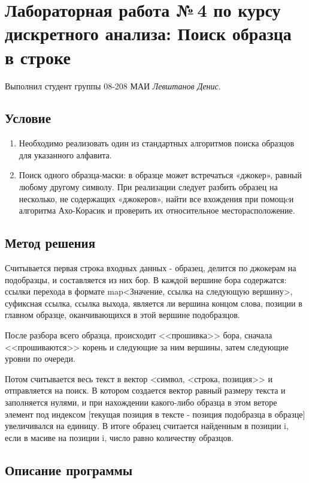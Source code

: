 \documentclass[12pt]{article}
\begin{document}
\section*{Лабораторная работа №\,4 по курсу дискретного анализа: Поиск образца в строке}

Выполнил студент группы 08-208 МАИ \textit{Левштанов Денис}.

\subsection*{Условие}

\begin{enumerate}
\item Необходимо реализовать один из стандартных алгоритмов поиска образцов для указанного алфавита.
\item Поиск одного образца-маски: в образце может встречаться «джокер», равный любому другому символу. При реализации следует разбить образец на несколько, не содержащих «джокеров», найти все вхождения при помощcи алгоритма Ахо-Корасик и проверить их относительное месторасположение.
\end{enumerate}

\subsection*{Метод решения}
\par Считывается первая строка входных данных - образец, делится по джокерам на подобразцы, и составляется из них бор. В каждой вершине бора содержатся: ссылки перехода в формате map<Значение, ссылка на следующую вершину>, суфиксная ссылка, ссылка выхода, является ли вершина концом слова, позиции в главном образце, оканчивающихся в этой вершине подобразцов.
\par После разбора всего образца, происходит <<прошивка>>  бора, сначала <<прошиваются>> корень и следующие за ним вершины, затем следующие уровни по очереди.
\par Потом считывается весь текст в вектор <символ, <строка, позиция>> и отправляется на поиск.
В котором создается вектор равный размеру текста и заполняется нулями, и при нахождении какого-либо образца в этом веторе элемент под индексом [текущая позиция в тексте - позиция подобразца в образце] увеличивался на единицу.
В итоге образец считается найденным в позиции i, если в масиве на позиции i, число равно количеству образцов.

\subsection*{Описание программы}
\end{document}
